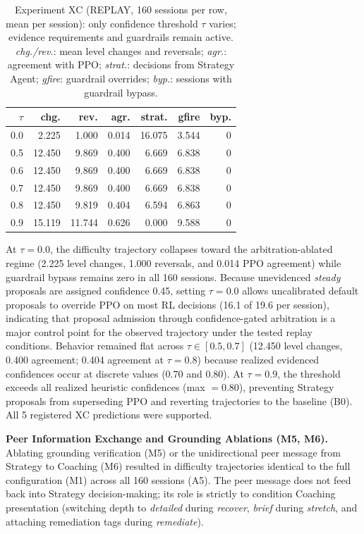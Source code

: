 \documentclass[runningheads]{llncs}
\begin{document}
\begin{table}[t]
\caption{Experiment XC (REPLAY, 160 sessions per row, mean per session): only confidence threshold $\tau$ varies; evidence requirements and guardrails remain active. \emph{chg./rev.}: mean level changes and reversals; \emph{agr.}: agreement with PPO; \emph{strat.}: decisions from Strategy Agent; \emph{gfire}: guardrail overrides; \emph{byp.}: sessions with guardrail bypass.}
\label{tab:xc}
\centering
\begin{tabular}{@{}rrrrrrr@{}}
\toprule
$\tau$ & chg. & rev. & agr. & strat. & gfire & byp. \\
\midrule
0.0 & 2.225  & 1.000 & 0.014 & 16.075 & 3.544 & 0 \\
0.5 & 12.450 & 9.869 & 0.400 & 6.669  & 6.838 & 0 \\
0.6 & 12.450 & 9.869 & 0.400 & 6.669  & 6.838 & 0 \\
0.7 & 12.450 & 9.869 & 0.400 & 6.669  & 6.838 & 0 \\
0.8 & 12.450 & 9.819 & 0.404 & 6.594  & 6.863 & 0 \\
0.9 & 15.119 & 11.744& 0.626 & 0.000  & 9.588 & 0 \\
\bottomrule
\end{tabular}
\end{table}

At $\tau=0.0$, the difficulty trajectory collapses toward the arbitration-ablated regime (2.225 level changes, 1.000 reversals, and 0.014 PPO agreement) while guardrail bypass remains zero in all 160 sessions. Because unevidenced \emph{steady} proposals are assigned confidence 0.45, setting $\tau=0.0$ allows uncalibrated default proposals to override PPO on most RL decisions (16.1 of 19.6 per session), indicating that proposal admission through confidence-gated arbitration is a major control point for the observed trajectory under the tested replay conditions. Behavior remained flat across $\tau \in [0.5, 0.7]$ (12.450 level changes, 0.400 agreement; 0.404 agreement at $\tau=0.8$) because realized evidenced confidences occur at discrete values (0.70 and 0.80). At $\tau=0.9$, the threshold exceeds all realized heuristic confidences (max $=0.80$), preventing Strategy proposals from superseding PPO and reverting trajectories to the baseline (B0). All 5 registered XC predictions were supported.

\textbf{Peer Information Exchange and Grounding Ablations (M5, M6).} Ablating grounding verification (M5) or the unidirectional peer message from Strategy to Coaching (M6) resulted in difficulty trajectories identical to the full configuration (M1) across all 160 sessions (A5). The peer message does not feed back into Strategy decision-making; its role is strictly to condition Coaching presentation (switching depth to \emph{detailed} during \emph{recover}, \emph{brief} during \emph{stretch}, and attaching remediation tags during \emph{remediate}).
\end{document}
